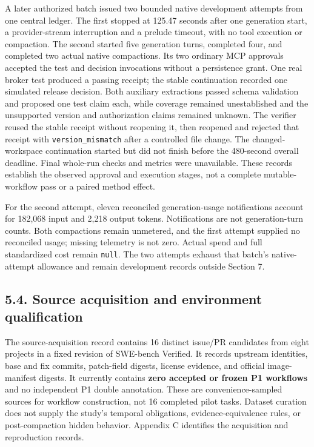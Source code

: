 \documentclass[
  11pt,
  a4paper,
]{article}
\begin{document}
A later authorized batch issued two bounded native development attempts
from one central ledger. The first stopped at 125.47 seconds after one
generation start, a provider-stream interruption and a prelude timeout,
with no tool execution or compaction. The second started five generation
turns, completed four, and completed two actual native compactions. Its
two ordinary MCP approvals accepted the test and decision invocations
without a persistence grant. One real broker test produced a passing
receipt; the stable continuation recorded one simulated release
decision. Both auxiliary extractions passed schema validation and
proposed one test claim each, while coverage remained unestablished and
the unsupported version and authorization claims remained unknown. The
verifier reused the stable receipt without reopening it, then reopened
and rejected that receipt with \texttt{version\_mismatch} after a
controlled file change. The changed-workspace continuation started but
did not finish before the 480-second overall deadline. Final whole-run
checks and metrics were unavailable. These records establish the
observed approval and execution stages, not a complete mutable-workflow
pass or a paired method effect.

For the second attempt, eleven reconciled generation-usage notifications
account for 182,068 input and 2,218 output tokens. Notifications are not
generation-turn counts. Both compactions remain unmetered, and the first
attempt supplied no reconciled usage; missing telemetry is not zero.
Actual spend and full standardized cost remain \texttt{null}. The two
attempts exhaust that batch's native-attempt allowance and remain
development records outside Section 7.

\subsection{5.4. Source acquisition and environment
qualification}\label{source-acquisition-and-environment-qualification}

The source-acquisition record contains 16 distinct issue/PR candidates
from eight projects in a fixed revision of SWE-bench Verified. It
records upstream identities, base and fix commits, patch-field digests,
license evidence, and official image-manifest digests. It currently
contains \textbf{zero accepted or frozen P1 workflows} and no
independent P1 double annotation. These are convenience-sampled sources
for workflow construction, not 16 completed pilot tasks. Dataset
curation does not supply the study's temporal obligations,
evidence-equivalence rules, or post-compaction hidden behavior. Appendix
C identifies the acquisition and reproduction records.
\end{document}
